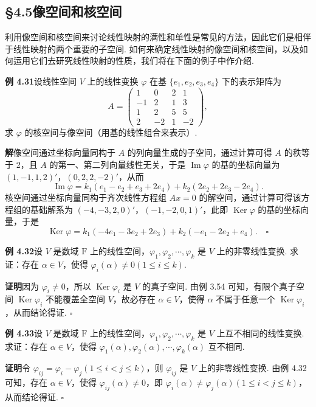 \documentclass[UTF8, 12pt, fontset=fandol, oneside]{ctexart}
\begin{document}
\subsection*{§4.5\quad 像空间和核空间}

利用像空间和核空间来讨论线性映射的满性和单性是常见的方法，因此它们是相伴于线性映射的两个重要的子空间. 如何来确定线性映射的像空间和核空间，以及如何运用它们去研究线性映射的性质，我们将在下面的例子中作介绍.

\noindent\textbf{例 4.31}\quad 设线性空间 $V$ 上的线性变换 $\varphi$ 在基 $\{e_1,e_2,e_3,e_4\}$ 下的表示矩阵为
\[
A=\left(\begin{array}{rrrr}
1 & 0 & 2 & 1\\
-1 & 2 & 1 & 3\\
1 & 2 & 5 & 5\\
2 & -2 & 1 & -2
\end{array}\right),
\]
求 $\varphi$ 的核空间与像空间（用基的线性组合来表示）.

\noindent\textbf{解}\quad 像空间通过坐标向量同构于 $A$ 的列向量生成的子空间，通过计算可得 $A$ 的秩等于 2，且 $A$ 的第一、第二列向量线性无关，于是 $\operatorname{Im}\varphi$ 的基的坐标向量为 $(1,-1,1,2)'$，$(0,2,2,-2)'$，从而
\[
\operatorname{Im}\varphi=k_1(e_1-e_2+e_3+2e_4)+k_2(2e_2+2e_3-2e_4).
\]
核空间通过坐标向量同构于齐次线性方程组 $Ax=0$ 的解空间，通过计算可得该方程组的基础解系为 $(-4,-3,2,0)'$，$(-1,-2,0,1)'$，此即 $\operatorname{Ker}\varphi$ 的基的坐标向量，于是
\[
\operatorname{Ker}\varphi=k_1(-4e_1-3e_2+2e_3)+k_2(-e_1-2e_2+e_4). \quad \square
\]

\noindent\textbf{例 4.32}\quad 设 $V$ 是数域 $\mathrm{F}$ 上的线性空间，$\varphi_1,\varphi_2,\cdots,\varphi_k$ 是 $V$ 上的非零线性变换. 求证：存在 $\alpha\in V$，使得 $\varphi_i(\alpha)\ne0(1\le i\le k)$.

\noindent\textbf{证明}\quad 因为 $\varphi_i\ne0$，所以 $\operatorname{Ker}\varphi_i$ 是 $V$ 的真子空间. 由例 3.54 可知，有限个真子空间 $\operatorname{Ker}\varphi_i$ 不能覆盖全空间 $V$，故必存在 $\alpha\in V$，使得 $\alpha$ 不属于任意一个 $\operatorname{Ker}\varphi_i$，从而结论得证. $\square$

\noindent\textbf{例 4.33}\quad 设 $V$ 是数域 $\mathrm{F}$ 上的线性空间，$\varphi_1,\varphi_2,\cdots,\varphi_k$ 是 $V$ 上互不相同的线性变换. 求证：存在 $\alpha\in V$，使得 $\varphi_1(\alpha),\varphi_2(\alpha),\cdots,\varphi_k(\alpha)$ 互不相同.

\noindent\textbf{证明}\quad 令 $\varphi_{ij}=\varphi_i-\varphi_j(1\le i<j\le k)$，则 $\varphi_{ij}$ 是 $V$ 上的非零线性变换. 由例 4.32 可知，存在 $\alpha\in V$，使得 $\varphi_{ij}(\alpha)\ne0$，即 $\varphi_i(\alpha)\ne\varphi_j(\alpha)(1\le i<j\le k)$，从而结论得证. $\square$
\end{document}
